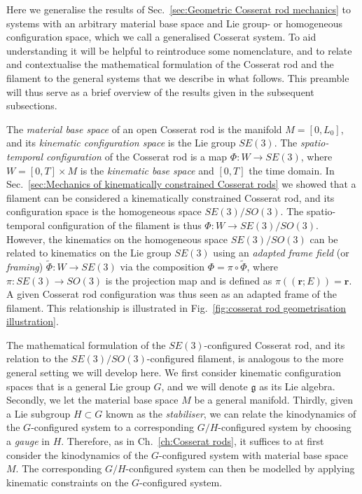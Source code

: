 Here we generalise the results of Sec.~\ref{sec:Geometric Cosserat rod mechanics} to systems with an arbitrary material base space and Lie group- or homogeneous configuration space, which we call a generalised Cosserat system. To aid understanding it will be helpful to reintroduce some nomenclature, and to relate and contextualise the mathematical formulation of the Cosserat rod and the filament to the general systems that we describe in what follows. This preamble will thus serve as a brief overview of the results given in the subsequent subsections.

The \textit{material base space} of an open Cosserat rod is the manifold $M = [0, L_0]$, and its \textit{kinematic configuration space} is the Lie group $SE(3)$. The \textit{spatio-temporal configuration} of the Cosserat rod is a map $\Phi : W \to SE(3)$, where $W = [0,T] \times M$ is the \textit{kinematic base space} and $[0,T]$ the time domain. In Sec.~\ref{sec:Mechanics of kinematically constrained Cosserat rods} we showed that a filament can be considered a kinematically constrained Cosserat rod, and its configuration space is the homogeneous space $SE(3)/SO(3)$. The spatio-temporal configuration of the filament is thus $\Phi : W \to SE(3) / SO(3)$. However, the kinematics on the homogeneous space $SE(3) / SO(3)$ can be related to kinematics on the Lie group $SE(3)$ using an \textit{adapted frame field} (or \textit{framing}) $\tilde{\Phi} : W \to SE(3)$ via the composition $\Phi = \pi \circ \tilde{\Phi}$, where $\pi : SE(3) \to SO(3)$ is the projection map and is defined as $\pi((\mathbf{r} ; E)) = \mathbf{r}$. A given Cosserat rod configuration was thus seen as an adapted frame of the filament. This relationship is illustrated in Fig.~\ref{fig:cosserat rod geometrisation illustration}.

The mathematical formulation of the $SE(3)$-configured Cosserat rod, and its relation to the $SE(3)/SO(3)$-configured filament, is analogous to the more general setting we will develop here. We first consider kinematic configuration spaces that is a general Lie group $G$, and we will denote $\mathfrak{g}$ as its Lie algebra. Secondly, we let the material base space $M$ be a general manifold. Thirdly, given a Lie subgroup $H \subset G$ known as the \textit{stabiliser}, we can relate the kinodynamics of the $G$-configured system to a corresponding $G/H$-configured system by choosing a \textit{gauge} in $H$. Therefore, as in Ch.~\ref{ch:Cosserat rods}, it suffices to at first consider the kinodynamics of the $G$-configured system with material base space $M$. The corresponding $G/H$-configured system can then be modelled by applying kinematic constraints on the $G$-configured system.

